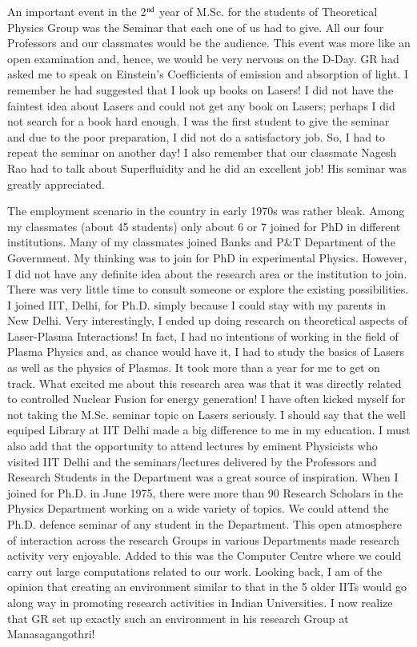 An important event in the 2$^{\rm nd}$ year of M.Sc. for the students of Theoretical Physics Group was the Seminar that each one of us had to give. All our four Professors and our classmates would be the audience. This event was more like an open examination and, hence, we would be very nervous on the D-Day. GR had asked me to speak on Einstein's Coefficients of emission and absorption of light. I remember he had suggested that I look up books on Lasers! I did not have the faintest idea about Lasers and could not get any book on Lasers; perhaps I did not search for a book hard enough. I was the first student to give the seminar and due to the poor preparation, I did not do a satisfactory job. So, I had to repeat the seminar on another day! I also remember that our classmate Nagesh Rao had to talk about Superfluidity and he did an excellent job! His seminar was greatly appreciated.

The employment scenario in the country in early 1970s was rather bleak. Among my classmates (about 45 students) only about 6 or 7 joined for PhD in different institutions. Many of my classmates joined Banks and P\&T Department of the Government. My thinking was to join for PhD in experimental Physics. However, I did not have any definite idea about the research area or the institution to join. There was very little time to consult someone or explore the existing possibilities. I joined IIT, Delhi, for Ph.D. simply because I could stay with my parents in New Delhi. Very interestingly, I ended up doing research on theoretical aspects of Laser-Plasma Interactions! In fact, I had no intentions of working in the field of Plasma Physics and, as chance would have it, I had to study the basics of Lasers as well as the physics of Plasmas. It took more than a year for me to get on track. What excited me about this research area was that it was directly related to controlled Nuclear Fusion for energy generation! I have often kicked myself for not taking the M.Sc. seminar topic on Lasers seriously. I should say that the well equiped Library at IIT Delhi made a big difference to me in my education. I must also add that the opportunity to attend lectures by eminent Physicists who visited IIT Delhi and the seminars/lectures delivered by the Professors and Research Students in the Department was a great source of inspiration. When I joined for Ph.D. in June 1975, there were more than 90 Research Scholars in the Physics Department working on a wide variety of topics. We could attend the Ph.D. defence seminar of any student in the Department. This open atmosphere of interaction across the research Groups in various Departments made research activity very enjoyable. Added to this was the Computer Centre where we could carry out large computations related to our work. Looking back, I am of the opinion that creating an environment similar to that in the 5 older IITs would go along way in promoting research activities in Indian Universities. I now realize that GR set up exactly such an environment in his research Group at Manasagangothri!

